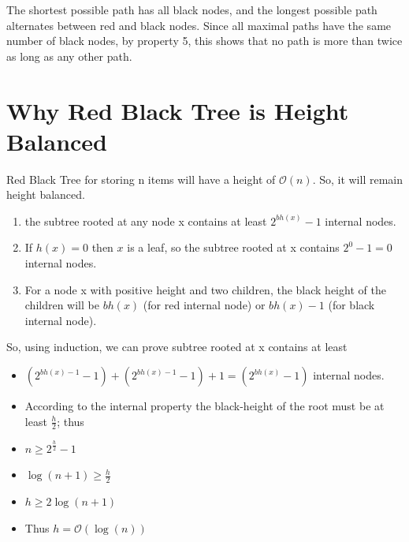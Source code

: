 \documentclass{article}[10pt]
\begin{document}
The shortest possible path has all black nodes, and the longest possible path alternates between red and black nodes. Since all maximal paths have the same number of black nodes, by property 5, this shows that no path is more than twice as long as any other path.

\section{Why Red Black Tree is Height Balanced}

Red Black Tree for storing n items will have a height of $\mathcal{O}(n)$. So, it will remain height balanced.

    \begin{enumerate}
        \item the subtree rooted at any node x contains at least $2^{bh(x)} - 1$  internal nodes. 
        \item If $h(x) = 0$ then $x$ is a leaf, so the subtree rooted at x contains $2^0-1 = 0$ internal nodes.
        \item For a node x with positive height and two children, the black height of the children will be $ bh(x) $ (for red internal node) or  $bh(x) - 1$ (for black internal node).
        
        
    \end{enumerate}
    \begin{center}
        
        \vspace{1cm}
        
        \vspace{1cm}
        
            
    \end{center}
   
    
    
    
 So, using induction, we can prove subtree rooted at x contains at least 
 \begin{itemize}
     \item $(2^{bh(x)-1}-1) + (2^{bh(x)-1}-1) + 1 = (2^{bh(x)} -1)$ internal nodes.
    \item According to the internal property the black-height of the root must be at least $\frac{h}{2}$; thus
    \item  $n \geqslant 2^{\frac{h}{2}}-1$
	\item  $\log(n+1) \geqslant \frac{h}{2}$
	\item $h \geqslant 2\log(n+1)$	
	\item Thus $h = \mathcal{O}(\log(n))$
    \end{itemize}        
\end{document}
